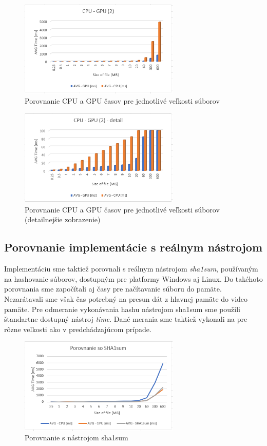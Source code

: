\documentclass[conference]{IEEEtran}
\begin{document}
\begin{figure}[h!]
\centering
\includegraphics[width=3in]{img/CPU-GPU2}
\caption{Porovnanie CPU a GPU časov pre jednotlivé veľkosti súborov}
\end{figure}

\begin{figure}[h!]
\centering
\includegraphics[width=3in]{img/CPU-GPUdetail2}
\caption{Porovnanie CPU a GPU časov pre jednotlivé veľkosti súborov (detailnejšie zobrazenie)}
\end{figure}


\subsection{Porovnanie implementácie s reálnym nástrojom}

Implementáciu sme taktiež porovnali s reálnym nástrojom \textit{sha1sum}, používaným na hashovanie súborov, dostupným pre platformy Windows aj Linux. Do takéhoto porovnania sme započítali aj časy pre načítavanie súboru do pamäte. Nezarátavali sme však čas potrebný na presun dát z hlavnej pamäte do video pamäte. Pre odmeranie vykonávania hashu nástrojom sha1sum sme použili štandartne dostupný nástroj \textit{time}. Dané merania sme taktiež vykonali na pre rôzne veľkosti ako v predchádzajúcom prípade. 

\begin{figure}[h!]
\centering
\includegraphics[width=3in]{img/sha1sum}
\caption{Porovnanie s nástrojom sha1sum}
\end{figure}
\end{document}
